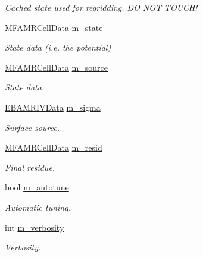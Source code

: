 \begin{DoxyCompactItemize}
\begin{DoxyCompactList}\small\item\em Cached state used for regridding. DO N\+OT T\+O\+U\+C\+H! \end{DoxyCompactList}\item 
\hyperlink{type__definitions_8H_aced885351d40daa466564acbee4042d3}{M\+F\+A\+M\+R\+Cell\+Data} \hyperlink{classpoisson__solver_a17fd22a61afb4fa05d0aa9ff13940d89}{m\+\_\+state}
\begin{DoxyCompactList}\small\item\em State data (i.\+e. the potential) \end{DoxyCompactList}\item 
\hyperlink{type__definitions_8H_aced885351d40daa466564acbee4042d3}{M\+F\+A\+M\+R\+Cell\+Data} \hyperlink{classpoisson__solver_ae5da801240340890973eb15e851c736a}{m\+\_\+source}
\begin{DoxyCompactList}\small\item\em State data. \end{DoxyCompactList}\item 
\hyperlink{type__definitions_8H_a6b8fa905d55cbb491b52180386f0e0c1}{E\+B\+A\+M\+R\+I\+V\+Data} \hyperlink{classpoisson__solver_ab9746460a6725b0e9ef913f32214239b}{m\+\_\+sigma}
\begin{DoxyCompactList}\small\item\em Surface source. \end{DoxyCompactList}\item 
\hyperlink{type__definitions_8H_aced885351d40daa466564acbee4042d3}{M\+F\+A\+M\+R\+Cell\+Data} \hyperlink{classpoisson__solver_a16ee594459be04b5adf33b53102362ee}{m\+\_\+resid}
\begin{DoxyCompactList}\small\item\em Final residue. \end{DoxyCompactList}\item 
bool \hyperlink{classpoisson__solver_a3c4bdf0a6b9169e0d91c2214ec904986}{m\+\_\+autotune}
\begin{DoxyCompactList}\small\item\em Automatic tuning. \end{DoxyCompactList}\item 
int \hyperlink{classpoisson__solver_a8a86e657da4585578123ef2042ada218}{m\+\_\+verbosity}
\begin{DoxyCompactList}\small\item\em Verbosity. \end{DoxyCompactList}\item 

\end{DoxyCompactItemize}
